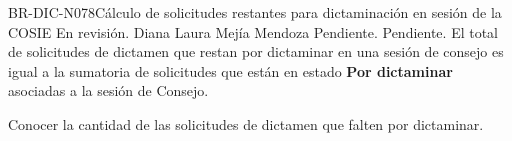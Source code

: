 
\begin{BusinessRule}{BR-DIC-N078}{Cálculo de solicitudes restantes para dictaminación en sesión de la COSIE}
	{\bcCondition} %
	{\btEnabler}     %
	{\blControlling}     %
	\BRItem[Estado] En revisión.
	 Diana Laura Mejía Mendoza
	 Pendiente.
	 Pendiente.
	\BRItem[Descripción] El total de solicitudes de dictamen que restan por dictaminar en una sesión de consejo es igual a la sumatoria de solicitudes que están en estado \textbf{Por dictaminar} asociadas a la sesión de Consejo.
	\BRItem[Sentencia] \cdtEmpty
	
%	
	\BRItem[Motivación] Conocer la cantidad de las solicitudes de dictamen que falten por dictaminar.
\end{BusinessRule}

